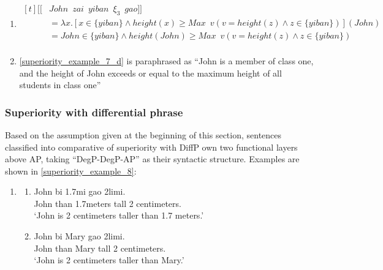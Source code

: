 \documentclass{ctexart}
\begin{document}
\begin{enumerate}
\begin{enumerate}
        \item \label{superiority_example_7_d}
        $\begin{aligned}[t]
            [\![&John \enspace zai \enspace yiban \enspace \xi_3 \enspace gao]\!] \\
            &= \lambda x.[x \in \{yiban \} \land height(x) \geq Max \enspace v(v=height(z) \land z \in \{yiban \})](John) \\
            &= John \in \{yiban \} \land height(John) \geq Max \enspace v(v=height(z) \land z \in \{yiban \}) \\
        \end{aligned}$

        \item \label{superiority_example_7_e}
        \ref{superiority_example_7_d} is paraphrased as ``John is a member of class one, and the height of John exceeds or equal to the  maximum height of all students in class one''

    \end{enumerate}
\end{enumerate}

\subsubsection{Superiority with differential phrase}

\noindent
Based on the assumption given at the beginning of this section, sentences classified into comparative of superiority with DiffP own two functional layers above AP, taking ``DegP-DegP-AP'' as their syntactic structure. Examples are shown in \ref{superiority_example_8}:

\begin{enumerate}
    \item \label{superiority_example_8}
    \begin{enumerate}
        \item \label{superiority_example_8_a}
        John bi \enspace \enspace 1.7mi \enspace \enspace \enspace gao \enspace \enspace 2limi. \\
        John than 1.7meters tall 2 centimeters. \\
        `John is 2 centimeters taller than 1.7 meters.'

        \item \label{superiority_example_8_b}
        John bi \enspace Mary \enspace gao \enspace \enspace \enspace 2limi. \\
        John than Mary tall 2 centimeters.  \\
        `John is 2 centimeters taller than Mary.'

    \end{enumerate}
\end{enumerate}
\end{document}
